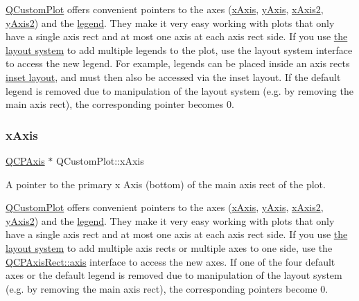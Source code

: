 \hyperlink{class_q_custom_plot}{Q\+Custom\+Plot} offers convenient pointers to the axes (\hyperlink{class_q_custom_plot_a9a79cd0158a4c7f30cbc702f0fd800e4}{x\+Axis}, \hyperlink{class_q_custom_plot_af6fea5679725b152c14facd920b19367}{y\+Axis}, \hyperlink{class_q_custom_plot_ada41599f22cad901c030f3dcbdd82fd9}{x\+Axis2}, \hyperlink{class_q_custom_plot_af13fdc5bce7d0fabd640f13ba805c0b7}{y\+Axis2}) and the \hyperlink{class_q_custom_plot_a4eadcd237dc6a09938b68b16877fa6af}{legend}. They make it very easy working with plots that only have a single axis rect and at most one axis at each axis rect side. If you use \hyperlink{}{the layout system} to add multiple legends to the plot, use the layout system interface to access the new legend. For example, legends can be placed inside an axis rect\textquotesingle{}s \hyperlink{class_q_c_p_axis_rect_a949f803466619924c7018df4b511ae10}{inset layout}, and must then also be accessed via the inset layout. If the default legend is removed due to manipulation of the layout system (e.\+g. by removing the main axis rect), the corresponding pointer becomes 0. \hypertarget{class_q_custom_plot_a9a79cd0158a4c7f30cbc702f0fd800e4}{}\label{class_q_custom_plot_a9a79cd0158a4c7f30cbc702f0fd800e4} 
\subsubsection{\texorpdfstring{x\+Axis}{xAxis}}
{\footnotesize\ttfamily \hyperlink{class_q_c_p_axis}{Q\+C\+P\+Axis} $\ast$ Q\+Custom\+Plot\+::x\+Axis}

A pointer to the primary x Axis (bottom) of the main axis rect of the plot.

\hyperlink{class_q_custom_plot}{Q\+Custom\+Plot} offers convenient pointers to the axes (\hyperlink{class_q_custom_plot_a9a79cd0158a4c7f30cbc702f0fd800e4}{x\+Axis}, \hyperlink{class_q_custom_plot_af6fea5679725b152c14facd920b19367}{y\+Axis}, \hyperlink{class_q_custom_plot_ada41599f22cad901c030f3dcbdd82fd9}{x\+Axis2}, \hyperlink{class_q_custom_plot_af13fdc5bce7d0fabd640f13ba805c0b7}{y\+Axis2}) and the \hyperlink{class_q_custom_plot_a4eadcd237dc6a09938b68b16877fa6af}{legend}. They make it very easy working with plots that only have a single axis rect and at most one axis at each axis rect side. If you use \hyperlink{}{the layout system} to add multiple axis rects or multiple axes to one side, use the \hyperlink{class_q_c_p_axis_rect_a583ae4f6d78b601b732183f6cabecbe1}{Q\+C\+P\+Axis\+Rect\+::axis} interface to access the new axes. If one of the four default axes or the default legend is removed due to manipulation of the layout system (e.\+g. by removing the main axis rect), the corresponding pointers become 0. \hypertarget{class_q_custom_plot_ada41599f22cad901c030f3dcbdd82fd9}{}\label{class_q_custom_plot_ada41599f22cad901c030f3dcbdd82fd9} 
